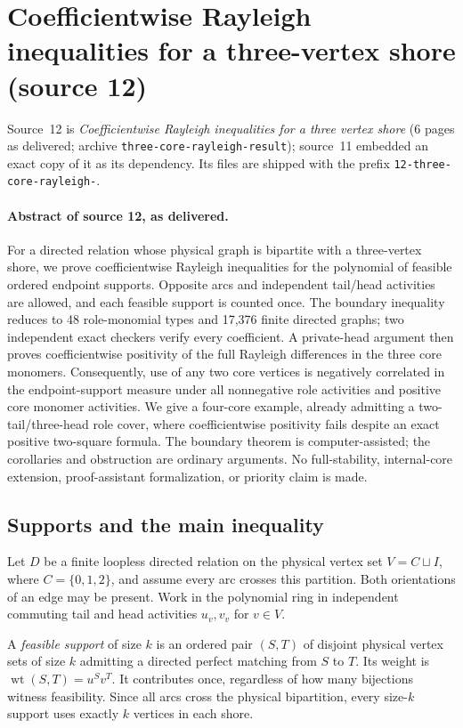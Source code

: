 \documentclass[11pt]{article}
\numberwithin{equation}{section}
\theoremstyle{definition}\newtheorem{definition}[theorem]{Definition}\newtheorem{remark}[theorem]{Remark}
\newcommand{\wt}{\operatorname{wt}}        %
\begin{document}
\section{Coefficientwise Rayleigh inequalities for a three-vertex shore (source 12)}\label{pgr:r:tc:sec}

Source~12 is \emph{Coefficientwise Rayleigh inequalities for a three vertex
shore} (6 pages as delivered; archive \texttt{three-core-rayleigh-result});
source~11 embedded an exact copy of it as its dependency. Its files are
shipped with the prefix \texttt{12-three-core-rayleigh-}.

\paragraph{Abstract of source 12, as delivered.}

For a directed relation whose physical graph is bipartite with a three-vertex shore, we prove coefficientwise Rayleigh inequalities for the polynomial of feasible ordered endpoint supports. Opposite arcs and independent tail/head activities are allowed, and each feasible support is counted once. The boundary inequality reduces to 48 role-monomial types and 17,376 finite directed graphs; two independent exact checkers verify every coefficient. A private-head argument then proves coefficientwise positivity of the full Rayleigh differences in the three core monomers. Consequently, use of any two core vertices is negatively correlated in the endpoint-support measure under all nonnegative role activities and positive core monomer activities. We give a four-core example, already admitting a two-tail/three-head role cover, where coefficientwise positivity fails despite an exact positive two-square formula. The boundary theorem is computer-assisted; the corollaries and obstruction are ordinary arguments. No full-stability, internal-core extension, proof-assistant formalization, or priority claim is made.

\subsection{Supports and the main inequality}
Let $D$ be a finite loopless directed relation on the physical vertex set
$V=C\sqcup I$, where $C=\{0,1,2\}$, and assume every arc crosses this partition.
Both orientations of an edge may be present. Work in the polynomial ring in
independent commuting tail and head activities $u_v,v_v$ for $v\in V$.

A \emph{feasible support} of size $k$ is an ordered pair $(S,T)$ of disjoint
physical vertex sets of size $k$ admitting a directed perfect matching from
$S$ to $T$. Its weight is $\wt(S,T)=u^Sv^T$. It contributes once, regardless
of how many bijections witness feasibility. Since all arcs cross the physical
bipartition, every size-$k$ support uses exactly $k$ vertices in each shore.
\end{document}

